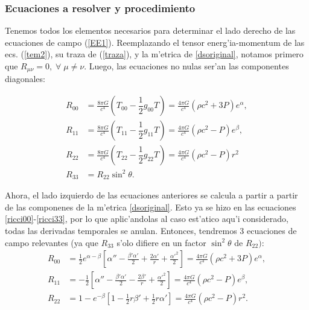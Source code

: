 \subsubsection{Ecuaciones a resolver y procedimiento}
Tenemos todos los elementos necesarios para determinar el lado derecho de las ecuaciones de campo (\ref{EE1}). Reemplazando el tensor energ'ia-momentum de las ecs. (\ref{tem2}), su traza de (\ref{traza}), y la m'etrica de \eqref{dsoriginal}, notamos primero que $R_{\mu\nu}=0,\;\forall\; \mu\neq\nu$. Luego, las ecuaciones no nulas ser'an las componentes diagonales:

\begin{align}
 R_{00}&=\frac{8\pi G}{c^{4}}\left( T_{00}-\dfrac{1}{2}g_{00}T\right)=
\frac{4\pi G}{c^{4}}(\rho c^2+3P)e^{\alpha},\\
R_{11}&=\frac{8\pi G}{c^{4}}\left( T_{11}-\dfrac{1}{2}g_{11}T\right)=
\frac{4\pi G}{c^{4}}(\rho c^2-P)e^{\beta},\\
R_{22}&=\frac{8\pi G}{c^{4}}\left(T_{22}-\dfrac{1}{2}g_{22}T\right)=
\frac{4\pi G}{c^{4}}(\rho c^2-P)r^2\\
R_{33}&=R_{22}\sin^2\theta.
\end{align}

Ahora, el lado izquierdo de las ecuaciones anteriores se calcula a partir a partir de las componenes de la m'etrica \eqref{dsoriginal}. Esto ya se hizo en las ecuaciones \eqref{ricci00}-\eqref{ricci33}, por lo que aplic'andolas al caso est'atico aqu'i considerado, todas las derivadas temporales se anulan. Entonces, tendremos 3 ecuaciones de campo relevantes (ya que $R_{33}$ s'olo difiere en un factor $\sin^2\theta$ de $R_{22})$:
\begin{align}
R_{00}&=\frac{1}{2}e^{\alpha-\beta}\left[\alpha''-\frac{\beta'\alpha'}{2}+\frac{2\alpha'}{r}+\frac{\alpha'^2}{2}\right]=\frac{4\pi G}{c^{4}}\left( \rho c^2+3P\right)e^{\alpha},\label{ricci0}\\
R_{11}&=-\frac{1}{2}\left[\alpha''-\frac{\beta'\alpha'}{2}-\frac{2\beta'}{r}+\frac{\alpha'^2}{2}\right]=\frac{4\pi G}{c^{4}}\left( \rho c^2-P\right)e^{\beta},\label{ricci1} \\
R_{22}&=1-e^{-\beta}\left[1-\frac{1}{2}r\beta'+\frac{1}{2}r\alpha'\right]=\frac{4\pi G}{c^{4}}\left( \rho c^2-P\right)r^2. \label{ricci2}
\end{align}

